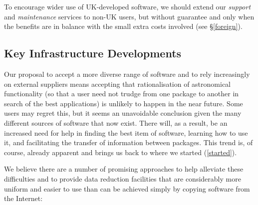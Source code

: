 \documentclass[twoside,11pt]{article}
\newcommand{\hyperref}[4]{#2\ref{#4}#3}
\newcommand{\htmlref}[2]{#1}
\newcommand{\latex}[1]{#1}
\newcommand{\st}[1]{{\em{#1}}}
\begin{document}
\label{international}To encourage wider use of UK-developed software,
we should extend our \st{support} and \st{maintenance} services to
non-UK users, but without guarantee and only when the
\htmlref{benefits}{foreign} are in balance with the small extra costs
involved\latex{ (see \S\ref{foreign})}.

\subsection{\label{infra}Key Infrastructure Developments}

Our proposal to accept a more diverse range of software and to rely
increasingly on external suppliers means accepting that
rationalisation of astronomical functionality (so that a user need not
trudge from one package to another in search of the best applications)
is unlikely to happen in the near future. Some users may regret this,
but it seems an unavoidable conclusion given the many different
sources of software that now exist.  There will, as a result, be an
increased need for help in finding the best item of software, learning
how to use it, and facilitating the transfer of information between
packages. This trend is, of course, already apparent and brings us
back to \hyperref{where we started}{where we started (}{)}{started}.

We believe there are a number of promising approaches to help
alleviate these difficulties and to provide data reduction facilities
that are considerably more uniform and easier to use than can be
achieved simply by copying software from the Internet:
\end{document}
